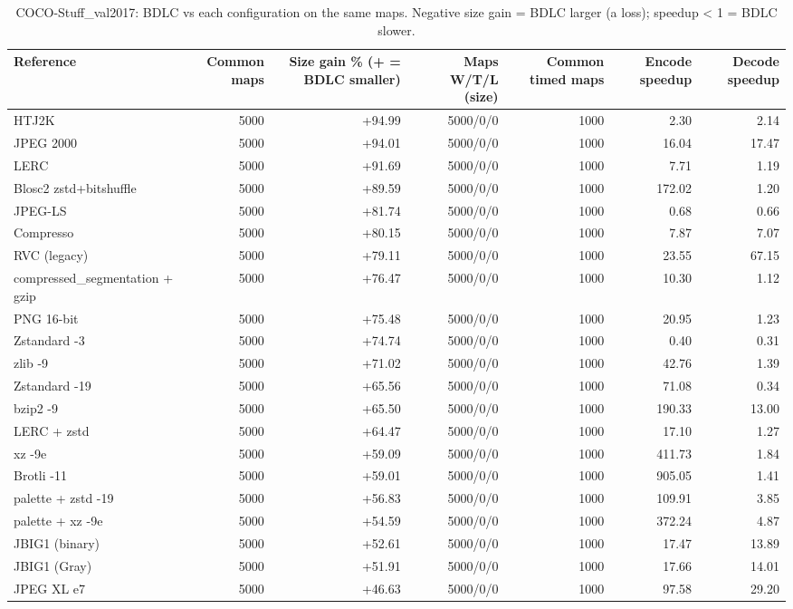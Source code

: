 \begin{table}[t]
\centering
\caption{COCO-Stuff\_val2017: BDLC vs each configuration on the same maps. Negative size gain = BDLC larger (a loss); speedup < 1 = BDLC slower.}
\begin{tabular}{lrrrrrr}
\hline
Reference & Common maps & Size gain \% (+ = BDLC smaller) & Maps W/T/L (size) & Common timed maps & Encode speedup & Decode speedup \\
\hline
HTJ2K & 5000 & +94.99 & 5000/0/0 & 1000 & 2.30 & 2.14 \\
JPEG 2000 & 5000 & +94.01 & 5000/0/0 & 1000 & 16.04 & 17.47 \\
LERC & 5000 & +91.69 & 5000/0/0 & 1000 & 7.71 & 1.19 \\
Blosc2 zstd+bitshuffle & 5000 & +89.59 & 5000/0/0 & 1000 & 172.02 & 1.20 \\
JPEG-LS & 5000 & +81.74 & 5000/0/0 & 1000 & 0.68 & 0.66 \\
Compresso & 5000 & +80.15 & 5000/0/0 & 1000 & 7.87 & 7.07 \\
RVC (legacy) & 5000 & +79.11 & 5000/0/0 & 1000 & 23.55 & 67.15 \\
compressed\_segmentation + gzip & 5000 & +76.47 & 5000/0/0 & 1000 & 10.30 & 1.12 \\
PNG 16-bit & 5000 & +75.48 & 5000/0/0 & 1000 & 20.95 & 1.23 \\
Zstandard -3 & 5000 & +74.74 & 5000/0/0 & 1000 & 0.40 & 0.31 \\
zlib -9 & 5000 & +71.02 & 5000/0/0 & 1000 & 42.76 & 1.39 \\
Zstandard -19 & 5000 & +65.56 & 5000/0/0 & 1000 & 71.08 & 0.34 \\
bzip2 -9 & 5000 & +65.50 & 5000/0/0 & 1000 & 190.33 & 13.00 \\
LERC + zstd & 5000 & +64.47 & 5000/0/0 & 1000 & 17.10 & 1.27 \\
xz -9e & 5000 & +59.09 & 5000/0/0 & 1000 & 411.73 & 1.84 \\
Brotli -11 & 5000 & +59.01 & 5000/0/0 & 1000 & 905.05 & 1.41 \\
palette + zstd -19 & 5000 & +56.83 & 5000/0/0 & 1000 & 109.91 & 3.85 \\
palette + xz -9e & 5000 & +54.59 & 5000/0/0 & 1000 & 372.24 & 4.87 \\
JBIG1 (binary) & 5000 & +52.61 & 5000/0/0 & 1000 & 17.47 & 13.89 \\
JBIG1 (Gray) & 5000 & +51.91 & 5000/0/0 & 1000 & 17.66 & 14.01 \\
JPEG XL e7 & 5000 & +46.63 & 5000/0/0 & 1000 & 97.58 & 29.20 \\

\end{tabular}
\end{table}
